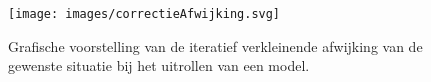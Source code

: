 \begin{figure}[p]
    \centering
    \texttt{[image: images/correctieAfwijking.svg]}
    \caption{Grafische voorstelling van de iteratief verkleinende afwijking van de gewenste situatie bij het uitrollen van een model.}
    \label{fig:correctieAfwijking}
\end{figure}


